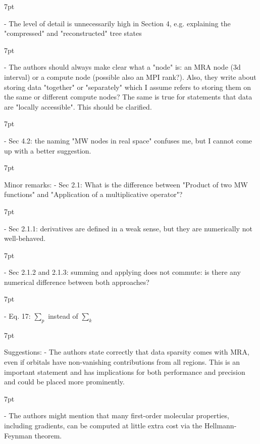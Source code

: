\documentclass[11pt]{article}
\newenvironment{formal}{%
  \def\FrameCommand{%
    \hspace{1pt}%
    {\color{darkblue}\vrule width 2pt}%
    {\color{formalshade}\vrule width 4pt}%
    \colorbox{formalshade}%
  }%
  \MakeFramed{\advance\hsize-\width\FrameRestore}%
  \noindent\hspace{-4.55pt}%
  \begin{adjustwidth}{}{7pt}%
  \vspace{2pt}\vspace{2pt}%
}
{%
  \vspace{2pt}\end{adjustwidth}\endMakeFramed%
}
\begin{document}
\begin{formal}
 - The level of detail is unnecessarily high in Section 4, e.g. explaining the "compressed" and "reconstructed" tree states
 \end{formal}
 
 \begin{formal}
 - The authors should always make clear what a "node" is: an MRA node (3d interval) or a compute node (possible also an MPI rank?). Also, they write about storing data "together" or "separately" which I assume refers to storing them on the same or different compute nodes? The same is true for statements that data are "locally accessible". This should be clarified.
 \end{formal}
 
 \begin{formal}
 - Sec 4.2: the naming "MW nodes in real space" confuses me, but I cannot come up with a better suggestion.
 \end{formal}
 
\begin{formal}
Minor remarks:
 - Sec 2.1: What is the difference between "Product of two MW functions" and "Application of a multiplicative operator"?
 \end{formal}
 
 \begin{formal}
 - Sec 2.1.1: derivatives are defined in a weak sense, but they are numerically not well-behaved.
 \end{formal}
 
 \begin{formal}
 - Sec 2.1.2 and 2.1.3: summing and applying does not commute: is there any numerical difference between both approaches?
 \end{formal}
 
 \begin{formal}
 - Eq. 17: $\sum_p$ instead of $\sum_k$
 \end{formal}

\begin{formal}
Suggestions:
 - The authors state correctly that data sparsity comes with MRA, even if orbitals have non-vanishing contributions from all regions. This is an important statement and has implications for both performance and precision and could be placed more prominently.
\end{formal}

\begin{formal}
 - The authors might mention that many first-order molecular properties, including gradients, can be computed at little extra cost via the Hellmann-Feynman theorem.
\end{formal}
\end{document}
